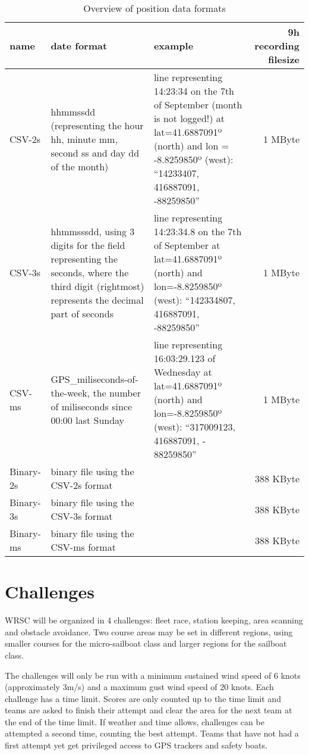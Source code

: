 \documentclass[12pt]{article}
\begin{document}
\begin{landscape}
\centering
\begin{table}
\small{
\begin{tabular}{l|p{6cm}|p{8cm}|r}
name   & date format & example & 9h recording filesize\\
\hline
CSV-2s & hhmmssdd (representing
the hour hh, minute mm, second ss and day dd of the month) &
line representing 14:23:34 on the 7th of September (month is not logged!) at lat=41.6887091º (north) and lon = -8.8259850º (west):
``14233407, 416887091, -88259850'' &
1 MByte\\ \hline

CSV-3s & hhmmsssdd, using 3 digits for the field representing the
seconds, where the third digit (rightmost) represents the decimal part of
seconds & line representing 14:23:34.8 on the 7th of September at
lat=41.6887091º (north) and lon=-8.8259850º (west):
``142334807, 416887091, -88259850''&
1 MByte \\ \hline

CSV-ms & GPS\_miliseconds-of-the-week, the number of miliseconds since 00:00 last Sunday &
line representing 16:03:29.123 of Wednesday at
lat=41.6887091º (north) and lon=-8.8259850º (west):
 “317009123, 416887091, - 88259850”&
1 MByte\\ \hline

Binary-2s &
binary file using the CSV-2s format&
&
388 KByte \\ \hline

Binary-3s &
binary file using the CSV-3s format&
&
388 KByte\\ \hline

Binary-ms &
binary file using the CSV-ms format &
&
388 KByte\\ \hline
\end{tabular}
}
\caption{Overview of position data formats}
\label{tab:dataformats}
\end{table}
\end{landscape}



\section{Challenges}
WRSC will be organized in 4 challenges: fleet race, station keeping, area
scanning and obstacle avoidance.
Two course areas may be set in different regions, using smaller courses for the
micro-sailboat class and larger regions for the sailboat class. 

The challenges will only be run with a minimum sustained wind speed of 6 knots
(approximately 3m/s) and a maximum gust wind speed of 20 knots.
Each challenge has a time limit. Scores are only counted up to the time limit 
and teams are asked to finish their attempt and clear the area for the next team 
at the end of the time limit. 
If weather and time allows, challenges can be attempted a
second time, counting the best attempt. Teams that have not had a
first attempt yet get privileged access to GPS trackers and safety boats.
\end{document}
